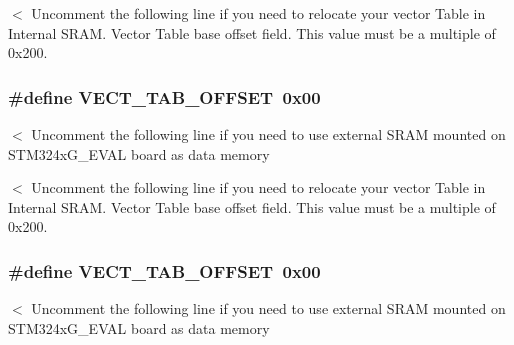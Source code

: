 $<$ Uncomment the following line if you need to relocate your vector Table in Internal S\-R\-A\-M. Vector Table base offset field. This value must be a multiple of 0x200. \hypertarget{group___s_t_m32_f4xx___system___private___defines_ga40e1495541cbb4acbe3f1819bd87a9fe}{
\subsubsection[{V\-E\-C\-T\-\_\-\-T\-A\-B\-\_\-\-O\-F\-F\-S\-E\-T}]{\setlength{\rightskip}{0pt plus 5cm}\#define V\-E\-C\-T\-\_\-\-T\-A\-B\-\_\-\-O\-F\-F\-S\-E\-T~0x00}}\label{group___s_t_m32_f4xx___system___private___defines_ga40e1495541cbb4acbe3f1819bd87a9fe}
$<$ Uncomment the following line if you need to use external S\-R\-A\-M mounted on S\-T\-M324x\-G\-\_\-\-E\-V\-A\-L board as data memory

$<$ Uncomment the following line if you need to relocate your vector Table in Internal S\-R\-A\-M. Vector Table base offset field. This value must be a multiple of 0x200. \hypertarget{group___s_t_m32_f4xx___system___private___defines_ga40e1495541cbb4acbe3f1819bd87a9fe}{
\subsubsection[{V\-E\-C\-T\-\_\-\-T\-A\-B\-\_\-\-O\-F\-F\-S\-E\-T}]{\setlength{\rightskip}{0pt plus 5cm}\#define V\-E\-C\-T\-\_\-\-T\-A\-B\-\_\-\-O\-F\-F\-S\-E\-T~0x00}}\label{group___s_t_m32_f4xx___system___private___defines_ga40e1495541cbb4acbe3f1819bd87a9fe}
$<$ Uncomment the following line if you need to use external S\-R\-A\-M mounted on S\-T\-M324x\-G\-\_\-\-E\-V\-A\-L board as data memory


